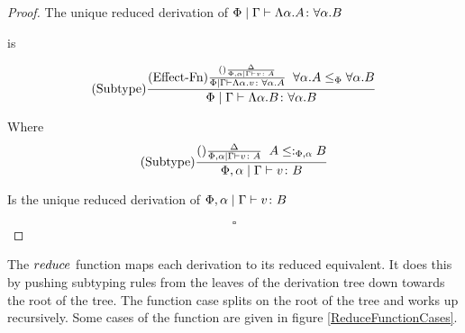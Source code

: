 \documentclass{Report}
\begin{document}
\begin{proof}
    The unique reduced derivation of $\Phi\mid\Gamma \vdash \Lambda \alpha. A \colon \forall \alpha. B$

    is 

    \begin{equation}
        (\text{Subtype}) \frac{
            (\text{Effect-Fn}) \frac{
                (\text{}) \frac{\Delta}{\Phi,\alpha\mid\Gamma \vdash v \colon A}
            }{
                \Phi\mid\Gamma \vdash \Lambda \alpha. v \colon \forall \alpha. A
            }
            \;\;
            \forall \alpha. A\leq_{\Phi}\forall \alpha. B
        }{
            \Phi\mid\Gamma \vdash \Lambda \alpha. B \colon \forall \alpha. B
        }
    \end{equation}

    Where
    \begin{eqnarray}
        (\text{Subtype}) \frac{
            (\text{}) \frac{\Delta}{\Phi,\alpha\mid\Gamma \vdash v \colon A}
            \;\;
            A\leq:_{\Phi, \alpha} B
        }{
            \Phi,\alpha\mid\Gamma \vdash v \colon B
        }
    \end{eqnarray}

    Is the unique reduced derivation of $\Phi,\alpha\mid\Gamma \vdash v \colon B$


    $$\square$$
\end{proof}


The $reduce$ function maps each derivation to its reduced equivalent. It does this by pushing subtyping rules from the leaves of the derivation tree down towards the root of the tree. The function case splits on the root of the tree and works up recursively. Some cases of the function are given in figure \ref{ReduceFunctionCases}. 
\end{document}

